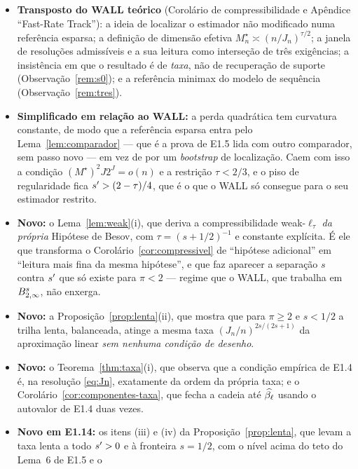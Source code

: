 \documentclass[11pt,a4paper]{article}
\newcommand{\Mstar}{M^{\star}}
\begin{document}
\begin{itemize}[nosep, leftmargin=*]
  \item \textbf{Transposto do WALL teórico} (Corolário de compressibilidade e
    Apêndice ``Fast-Rate Track''): a ideia de localizar o estimador não
    modificado numa referência esparsa; a definição de dimensão efetiva
    $\Mstar_{n} \asymp (n/J_{n})^{\tau/2}$; a janela de resoluções admissíveis
    e a sua leitura como interseção de três exigências; a insistência em que o
    resultado é de \emph{taxa}, não de recuperação de suporte
    (Observação~\ref{rem:s0}); e a referência minimax do modelo de sequência
    (Observação~\ref{rem:tres}).
  \item \textbf{Simplificado em relação ao WALL:} a perda quadrática tem
    curvatura constante, de modo que a referência esparsa entra pelo
    Lema~\ref{lem:comparador} --- que é a prova de E1.5 lida com outro
    comparador, sem passo novo --- em vez de por um \emph{bootstrap} de
    localização. Caem com isso a condição $(\Mstar)^{2}J2^{J} = o(n)$ e a
    restrição $\tau < 2/3$, e o piso de regularidade fica
    $s' > (2-\tau)/4$, que é o que o WALL só consegue para o seu estimador
    restrito.
  \item \textbf{Novo:} o Lema~\ref{lem:weak}(i), que deriva a
    compressibilidade weak-$\ell_{\tau}$ \emph{da própria} Hipótese de Besov,
    com $\tau = (s+1/2)^{-1}$ e constante explícita. É ele que transforma o
    Corolário~\ref{cor:compressivel} de ``hipótese adicional'' em ``leitura
    mais fina da mesma hipótese'', e que faz aparecer a separação
    $s$ contra $s'$ que só existe para $\pi < 2$ --- regime que o WALL, que
    trabalha em $B^{s}_{2,\infty}$, não enxerga.
  \item \textbf{Novo:} a Proposição~\ref{prop:lenta}(ii), que mostra que para
    $\pi \ge 2$ e $s < 1/2$ a trilha lenta, balanceada, atinge a mesma taxa
    $(J_{n}/n)^{2s/(2s+1)}$ da aproximação linear \emph{sem nenhuma condição de
    desenho}.
  \item \textbf{Novo:} o Teorema~\ref{thm:taxa}(i), que observa que a condição
    empírica de E1.4 é, na resolução \eqref{eq:Jn}, exatamente da ordem da
    própria taxa; e o Corolário~\ref{cor:componentes-taxa}, que fecha a cadeia
    até $\widehat{\beta_{\ell}}$ usando o autovalor de E1.4 duas vezes.
  \item \textbf{Novo em E1.14:} os itens (iii) e (iv) da
    Proposição~\ref{prop:lenta}, que levam a taxa lenta a todo $s' > 0$ e à
    fronteira $s = 1/2$, com o nível acima do teto do Lema~6 de E1.5 e o

\end{itemize}
\end{document}
